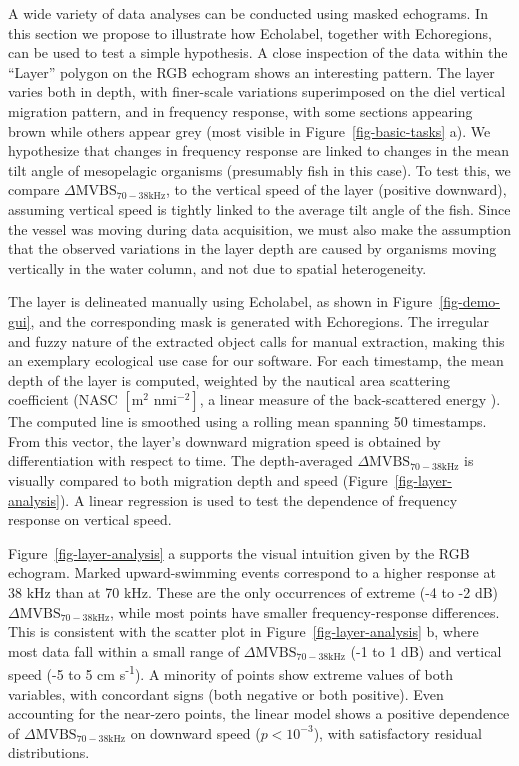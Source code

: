 \documentclass[
  number,
  preprint,
  3p]{elsarticle}
\begin{document}
A wide variety of data analyses can be conducted using masked echograms.
In this section we propose to illustrate how Echolabel, together with
Echoregions, can be used to test a simple hypothesis. A close inspection
of the data within the ``Layer'' polygon on the RGB echogram shows an
interesting pattern. The layer varies both in depth, with finer-scale
variations superimposed on the diel vertical migration pattern, and in
frequency response, with some sections appearing brown while others
appear grey (most visible in Figure~\ref{fig-basic-tasks} a). We
hypothesize that changes in frequency response are linked to changes in
the mean tilt angle of mesopelagic organisms (presumably fish in this
case). To test this, we compare
\(\Delta \text{MVBS}_{70 - 38 \text{kHz}}\), to the vertical speed of
the layer (positive downward), assuming vertical speed is tightly linked
to the average tilt angle of the fish. Since the vessel was moving
during data acquisition, we must also make the assumption that the
observed variations in the layer depth are caused by organisms moving
vertically in the water column, and not due to spatial heterogeneity.

The layer is delineated manually using Echolabel, as shown in
Figure~\ref{fig-demo-gui}, and the corresponding mask is generated with
Echoregions. The irregular and fuzzy nature of the extracted object
calls for manual extraction, making this an exemplary ecological use
case for our software. For each timestamp, the mean depth of the layer
is computed, weighted by the nautical area scattering coefficient
(\(\text{NASC } [\text{m}^2 \text{ nmi}^{-2}]\), a linear measure of the
back-scattered energy \citep{maclennan2002}). The computed line is
smoothed using a rolling mean spanning 50 timestamps. From this vector,
the layer's downward migration speed is obtained by differentiation with
respect to time. The depth-averaged
\(\Delta \text{MVBS}_{70 - 38 \text{kHz}}\) is visually compared to both
migration depth and speed (Figure~\ref{fig-layer-analysis}). A linear
regression is used to test the dependence of frequency response on
vertical speed.

Figure~\ref{fig-layer-analysis} a supports the visual intuition given by
the RGB echogram. Marked upward-swimming events correspond to a higher
response at 38 kHz than at 70 kHz. These are the only occurrences of
extreme (-4 to -2 dB) \(\Delta \text{MVBS}_{70 - 38 \text{kHz}}\), while
most points have smaller frequency-response differences. This is
consistent with the scatter plot in Figure~\ref{fig-layer-analysis} b,
where most data fall within a small range of
\(\Delta \text{MVBS}_{70 - 38 \text{kHz}}\) (-1 to 1 dB) and vertical
speed (-5 to 5 cm s\textsuperscript{-1}). A minority of points show
extreme values of both variables, with concordant signs (both negative
or both positive). Even accounting for the near-zero points, the linear
model shows a positive dependence of
\(\Delta \text{MVBS}_{70 - 38 \text{kHz}}\) on downward speed
(\(p < 10^{-3}\)), with satisfactory residual distributions.
\end{document}
